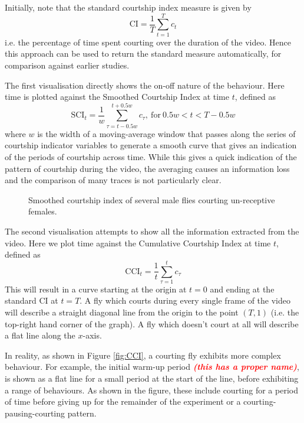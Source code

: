 \documentclass[twocolumn]{article}
\newcommand{\todo}[1]{\textsf{\emph{\textbf{\textcolor{red}{#1}}}}}
\begin{document}
Initially, note that the standard courtship index measure is given by
\begin{equation}
	\mathrm{CI} = \frac{1}{T}\sum_{t=1}^Tc_t
\end{equation}
i.e. the percentage of time spent courting over the duration of the video. Hence this approach can be used to return the standard measure automatically, for comparison against earlier studies. 

The first visualisation directly shows the on-off nature of the behaviour. Here time is plotted against the Smoothed Courtship Index at time $t$, defined as
\begin{equation}
	\mathrm{SCI}_t = \frac{1}{w}\sum_{\tau=t-0.5w}^{t+0.5w}c_\tau, ~ \mathrm{for} ~ 0.5w<t<T-0.5w
\end{equation}
where $w$ is the width of a moving-average window that passes along the series of courtship indicator variables to generate a smooth curve that gives an indication of the periods of courtship across time. While this gives a quick indication of the pattern of courtship during the video, the averaging causes an information loss and the comparison of many traces is not particularly clear. 

\begin{figure}
	\caption{Smoothed courtship index of several male flies courting un-receptive females.}
	\label{fig:SCI}
\end{figure}

The second visualisation attempts to show all the information extracted from the video. Here we plot time against the Cumulative Courtship Index at time $t$, defined as
\begin{equation}
	\mathrm{CCI}_t = \frac{1}{t}\sum_{\tau=1}^t c_\tau
\end{equation}
This will result in a curve starting at the origin at $t=0$ and ending at the standard CI at $t=T$. A fly which courts during every single frame of the video will describe a straight diagonal line from the origin to the point $(T,1)$ (i.e. the top-right hand corner of the graph). A fly which doesn't court at all will describe a flat line along the $x$-axis. 

In reality, as shown in Figure \ref{fig:CCI}, a courting fly exhibits more complex behaviour. For example, the initial warm-up period \todo{(this has a proper name)}, is shown as a flat line for a small period at the start of the line, before exhibiting a range of behaviours. As shown in the figure, these include courting for a period of time before giving up for the remainder of the experiment or a courting-pausing-courting pattern. 
\end{document}
